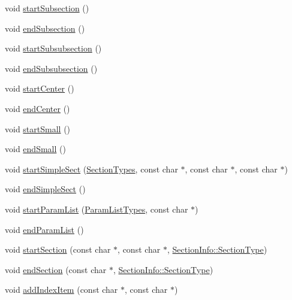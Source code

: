 \begin{DoxyCompactItemize}
void \hyperlink{class_html_generator_ad5672bd4e2cf016436ce21392f366868}{start\+Subsection} ()
\item 
void \hyperlink{class_html_generator_abc4bc4379bbff6450b129ac605dc9416}{end\+Subsection} ()
\item 
void \hyperlink{class_html_generator_a36a9752e811198e008617ad624066be0}{start\+Subsubsection} ()
\item 
void \hyperlink{class_html_generator_af08ae4e64ba09f0e0d4afbf496011243}{end\+Subsubsection} ()
\item 
void \hyperlink{class_html_generator_a233402f133de12862b43bfdd202fd050}{start\+Center} ()
\item 
void \hyperlink{class_html_generator_abc11851ba8f0b133e5c664ecd9504496}{end\+Center} ()
\item 
void \hyperlink{class_html_generator_abfec4f0b6bf47b4bf4635876f094363e}{start\+Small} ()
\item 
void \hyperlink{class_html_generator_aae94afd45fc65086afdc6c3204e67a1f}{end\+Small} ()
\item 
void \hyperlink{class_html_generator_aca9d9cd03420d38b7103c86dea817a1b}{start\+Simple\+Sect} (\hyperlink{class_base_output_doc_interface_a07a3d5df76a714674e070e5e236fe886}{Section\+Types}, const char $\ast$, const char $\ast$, const char $\ast$)
\item 
void \hyperlink{class_html_generator_a96f0170ae27a873fbbf9570deedf51d9}{end\+Simple\+Sect} ()
\item 
void \hyperlink{class_html_generator_a65ea430579ba2d902cfb1afbb740f225}{start\+Param\+List} (\hyperlink{class_base_output_doc_interface_a944ed4d9fb389999c2724eeb321b8c8c}{Param\+List\+Types}, const char $\ast$)
\item 
void \hyperlink{class_html_generator_a540b07cf18af5217bac8603e32c8586a}{end\+Param\+List} ()
\item 
void \hyperlink{class_html_generator_a8be287f3a8b68b1aaf0ce945a246ef32}{start\+Section} (const char $\ast$, const char $\ast$, \hyperlink{struct_section_info_a32308f52dd59422b14fb75a92c90ebf1}{Section\+Info\+::\+Section\+Type})
\item 
void \hyperlink{class_html_generator_a0f92a2fa1124ae02396ed560aa925b0f}{end\+Section} (const char $\ast$, \hyperlink{struct_section_info_a32308f52dd59422b14fb75a92c90ebf1}{Section\+Info\+::\+Section\+Type})
\item 
void \hyperlink{class_html_generator_aa966249e9239eff3631f57211f314504}{add\+Index\+Item} (const char $\ast$, const char $\ast$)
\item 

\end{DoxyCompactItemize}
